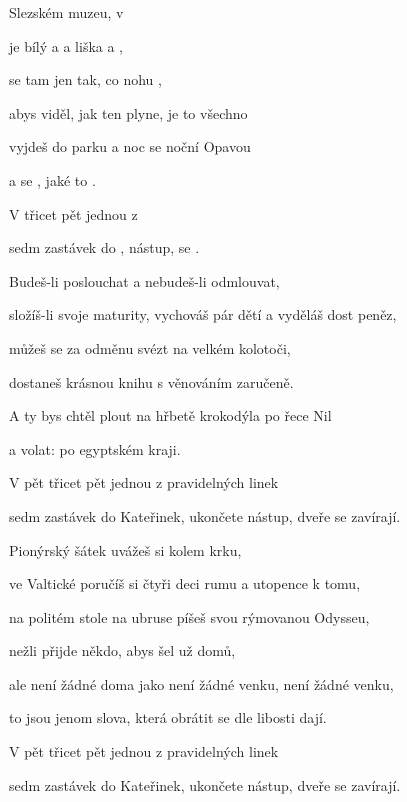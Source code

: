 

\zs
{} Slezském muzeu, v  

je bílý  a  a liška a  , 

 se tam jen tak, co  nohu ,

abys viděl, jak ten  plyne,  je to všechno  

 vyjdeš do parku a  noc se  noční Opavou

a  se , jaké to  .

V  třicet pět jednou z  

sedm zastávek do ,  nástup,  se .
\ks

\zs
Budeš-li poslouchat a nebudeš-li odmlouvat,

složíš-li svoje maturity, vychováš pár dětí a vyděláš dost peněz,

můžeš se za odměnu svézt na velkém kolotoči,

dostaneš krásnou knihu s věnováním zaručeně.

A ty bys chtěl plout na hřbetě krokodýla po řece Nil

a volat:  po egyptském kraji.

V pět třicet pět jednou z pravidelných linek

sedm zastávek do Kateřinek, ukončete nástup, dveře se zavírají.
\ks

\zs
Pionýrský šátek uvážeš si kolem krku,

ve Valtické poručíš si čtyři deci rumu a utopence k tomu,

na politém stole na ubruse píšeš svou rýmovanou Odysseu,

nežli přijde někdo, abys šel už domů,

ale není žádné doma jako není žádné venku, není žádné venku,

to jsou jenom slova, která obrátit se dle libosti dají.

V pět třicet pět jednou z pravidelných linek

sedm zastávek do Kateřinek, ukončete nástup, dveře se zavírají.
\ks

